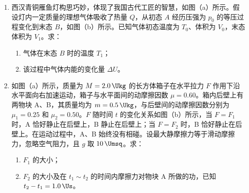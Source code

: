 \documentclass[\gkver]{gaokaozhenti}
\begin{document}
\begin{enumerate}
{（5）由图可知 $n-c$ 图线斜率
\[
k=\frac{1.38-1.33}{0.255-0.02}\approx0.213
\]
截距 $b=1.326$，可得盐水折射率 $n$ 与其浓度 $c$ 的函数关系式为 $n=0.213c+1.326$。
}

\item
西汉青铜雁鱼灯构思巧妙，体现了我国古代工匠的智慧，如图（a）所示。假设灯内一定质量的理想气体吸收了热量 $Q$，从初态 $A$ 经历压强为 $p_0$ 的等压过程变化到末态 $B$，如图（b）所示。已知气体初态温度为 $T_0$、体积为 $V_0$，末态体积为 $V_1$。求：
\begin{enumerate}
	\item
	气体在末态 $B$ 时的温度 $T_1$；
	\item
	该过程中气体内能的变化量 $\Delta U$。
\end{enumerate}

\item
如图（a）所示，质量为 $M=2.0\,\Ukg$ 的长方体箱子在水平拉力 $F$ 作用下沿水平面向右加速运动，箱子与水平面间的动摩擦因数 $\mu=0.60$。箱内后壁上有两物块 A、B，其质量均为 $m=0.5\,\Ukg$，与后壁间的动摩擦因数分别为 $\mu_1=0.25$ 和 $\mu_2=0.50$。$F$ 随时间 $t$ 的变化关系如图（b）所示，当 $F=F_1$ 时，A 恰好静止在后壁上，B 静止在后壁上；当 $F=F_2$ 时，B 恰好静止在后壁上。在运动过程中，A、B 始终没有相碰。设最大静摩擦力等于滑动摩擦力，忽略空气阻力，且 $g$ 取 $10\,\Umsq$。求：
\begin{enumerate}
	\item
	$F_1$ 的大小；
	\item
	$F_2$ 的大小及在 $t_1\sim t_2$ 的时间内摩擦力对物块 A 所做的功，已知 $t_2-t_1=1.0\,\Us$。
\end{enumerate}
\end{enumerate}
\end{document}
